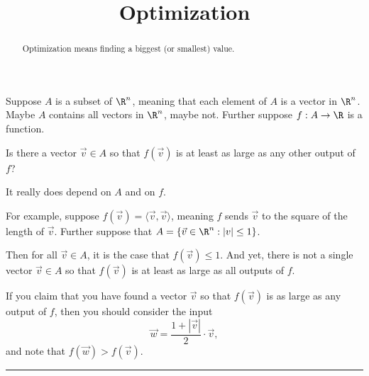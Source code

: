 \documentclass{ximera}
\title{Optimization}
\begin{document}
\begin{abstract}
  Optimization means finding a biggest (or smallest) value.
\end{abstract}\maketitle

Suppose $A$ is a subset of $\R^n$, meaning that each element of $A$ is
a vector in $\R^n$.  Maybe $A$ contains all vectors in $\R^n$, maybe
not.  Further suppose $f : A \to \R$ is a function.

\begin{question}
  Is there a vector $\vec{v} \in A$ so that $f(\vec{v})$ is at least
  as large as any other output of $f$?

  \begin{solution}
    \begin{multiple-choice}
    \end{multiple-choice}
  \end{solution}

  It really does depend on $A$ and on $f$.

  For example, suppose $f(\vec{v}) = \langle \vec{v}, \vec{v}
  \rangle$, meaning $f$ sends $\vec{v}$ to the square of the length of
  $\vec{v}$.  Further suppose that $A = \{ \vec{v} \in \R^n : |v| \le
  1 \}$.

  Then for all $\vec{v} \in A$, it is the case that $f(\vec{v}) \le
  1$.  And yet, there is not a single vector $\vec{v} \in A$ so that
  $f(\vec{v})$ is at least as large as all outputs of $f$.

  If you claim that you have found a vector $\vec{v}$ so that
  $f(\vec{v})$ is as large as any output of $f$, then you should consider the input
  $$
  \vec{w} = \frac{1 + |\vec{v}|}{2} \cdot \vec{v},
  $$
  and note that $f(\vec{w}) \gt f(\vec{v})$.
\end{question}

\hrule
\end{document}
